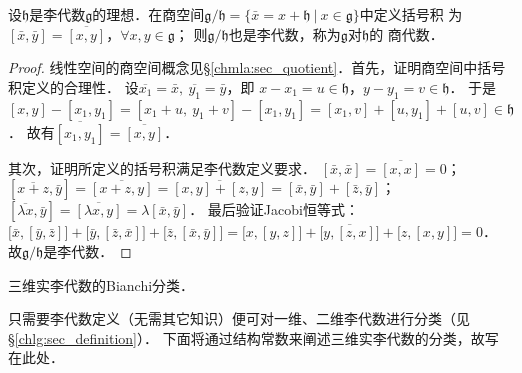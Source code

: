 \begin{proposition}\label{chlg:thm_quotient-algebra}
    设$\mathfrak{h}$是李代数$\mathfrak{g}$的理想．在{\kaishu 商空间}$\mathfrak{g}/\mathfrak{h}=
    \{\bar{x}=x+\mathfrak{h} \ |\ x\in \mathfrak{g} \}$中定义括号积
    为$[\bar{x},\bar{y}]=\overline{[x,y]}$，$\forall x,y \in \mathfrak{g}$；
    则$\mathfrak{g}/\mathfrak{h}$也是李代数，称为$\mathfrak{g}$对$\mathfrak{h}$的
    {\heiti 商代数}．  
\end{proposition}
\begin{proof}
    线性空间的商空间概念见\S\ref{chmla:sec_quotient}．首先，证明商空间中括号积定义的合理性．
    设$\overline{x_1}=\bar{x},\ \overline{y_1}=\bar{y}$，即
    $x-x_1=u\in \mathfrak{h}$，$y-y_1=v\in \mathfrak{h}$．
    于是$[x,y]-[x_1,y_1]=[x_1+u,\  y_1+v]-[x_1,y_1]=[x_1,v]+[u,y_1]+[u,v]\in \mathfrak{h}$．
    故有$\overline{[x_1,y_1]}=\overline{[x,y]}$．
    
    其次，证明所定义的括号积满足李代数定义要求．
    $[\bar{x},\bar{x}]=\overline{[x,x]}=0$；
    $[\overline{x+z},\bar{y}]=\overline{[x+z,y]}=\overline{[x,y]+[z,y]}
    =[\bar{x},\bar{y}]+[\bar{z},\bar{y}]$；
    $[\overline{\lambda x},\bar{y}]=\overline{[\lambda x,y]}=\lambda[\bar{x},\bar{y}]$．
    最后验证Jacobi恒等式：
    $\bigl[\bar{x},[\bar{y},\bar{z}]\bigr]+\bigl[\bar{y},[\bar{z},\bar{x}]\bigr]+\bigl[\bar{z},[\bar{x},\bar{y}]\bigr]
    =\overline{\bigl[x,[y,z]\bigr]+\bigl[y,[z,x]\bigr]+\bigl[z,[x,y]\bigr]}=0$．
    故$\mathfrak{g}/\mathfrak{h}$是李代数．
\end{proof}


\begin{example}
	三维实李代数的Bianchi分类．
\end{example}

只需要李代数定义（无需其它知识）便可对一维、二维李代数进行分类（见\S\ref{chlg:sec_definition}）．
下面将通过结构常数来阐述三维实李代数的分类\cite[\S 116]{landau_2-classical-fields}，故写在此处．


